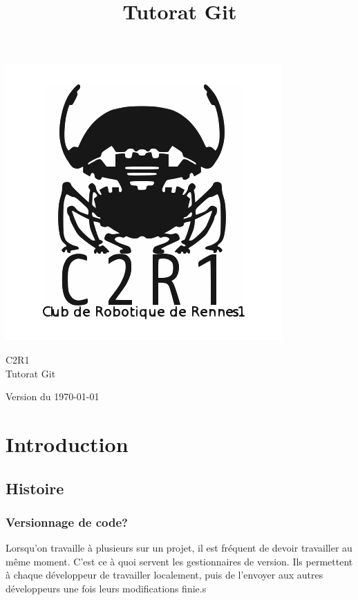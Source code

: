 \documentclass[a4paper,10pt]{report}
\title{Tutorat Git}
\begin{document}
\renewcommand{\chaptername}{Partie}

\begin{titlepage}
\vspace{-3cm}\hspace{-2cm}\includegraphics[scale=0.4]{C2R1}
\begin{center}
\vspace{2cm}
{\selectfont
\Large{C2R1}\\
\vspace{0.5cm}
\Huge{Tutorat Git}}\\
\end{center}
\begin{flushright}
 \vfill
{\selectfont
\large{Version du \today}}
\end{flushright}
\end{titlepage}

\pagestyle{fancy}

\tableofcontents
\newpage

\chapter{Introduction}
  \section{Histoire}
    \subsection{Versionnage de code?}
Lorsqu'on travaille \`a plusieurs sur un projet, il est fr\'equent de devoir travailler au m\^eme moment. C'est ce \`a quoi servent les gestionnaires de version. Ils permettent \`a chaque d\'eveloppeur de travailler localement, puis de l'envoyer aux autres d\'eveloppeurs une fois leurs modifications finie.s
\end{document}
